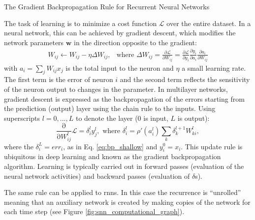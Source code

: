 \documentclass[journal,onecolumn,11pt]{IEEEtran}
\newcommand{\Dp}[2][]{\frac{\partial #1}{\partial #2}}
\begin{document}
\begin{infobox}
  \begin{mdframed}[backgroundcolor=black!10]\small
    \caption{\label{box:bp} The Gradient Backpropagation Rule for Recurrent Neural Networks} 
    The task of learning is to minimize a cost function $\mathcal{L}$ over the entire dataset.
    In a neural network, this can be achieved by gradient descent, which modifies the network parameters $\mathbf{w}$ in the direction opposite to the gradient:
    \begin{equation}\label{eq:bp_shallow}
      \begin{split}
        W_{ij} \leftarrow W_{ij} - \eta \Delta W_{ij},  & \text{where } \Delta W_{ij} =
        \Dp[\mathcal{L}]{W_{ij}} = 
       \Dp[\mathcal{L}]{y_i} %
       \Dp[y_i]{ a_i }       %
       \Dp[a_i]{W_{ij}}      %
      \end{split}
    \end{equation}
    with $a_i = \sum_j W_{ij} x_j$ is the total input to the neuron and $\eta$ a small learning rate. 
    The first term is the error of neuron $i$ and the second term reflects the sensitivity of the neuron output to changes in the parameter.
    In multilayer networks, gradient descent is expressed as the backpropagation of the errors starting from the prediction (output) layer using the chain rule to the inputs. 
    Using superscripts $l=0,...,L$ to denote the layer ($0$ is input, $L$ is output):
    \begin{equation}\label{eq:bp_deep}
      \frac{\mathrm{\partial}}{\mathrm{\partial} W^{l}_{ij}} \mathcal{L} = \delta_{i}^{l}  y^{l}_j,\text{ where }\delta_{i}^{l} = \rho'\left( a_i^l \right) \sum_k \delta_{k}^{l+1} W_{ki}^{l},
    \end{equation}
    where the $\delta_{i}^L=err_i$, as in Eq. \ref{eq:bp_shallow} and $y_{i}^0=x_i$.
    This update rule is ubiquitous in deep learning \cite{Rumelhart_etal88_paradist} and known as the gradient backpropagation algorithm.   
    Learning is typically carried out in forward passes (evaluation of the neural network activities) and backward passes (evaluation of $\delta$s).
    
    The same rule can be applied to \Glspl{rnn}. 
    In this case the recurrence is ``unrolled'' meaning that an auxiliary network is created by making copies of the network for each time step (see Figure \ref{fig:snn_computational_graph}).
    

\end{mdframed}
\end{infobox}
\end{document}
